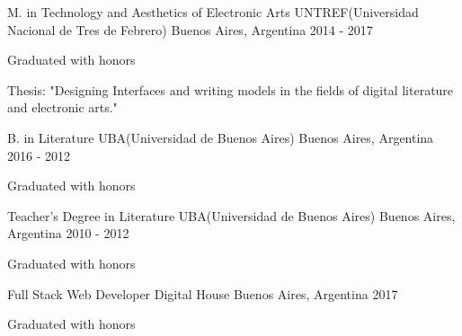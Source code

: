 

\begin{cventries}

  \cventry
    {M. in Technology and Aesthetics of Electronic Arts} %
    {UNTREF(Universidad Nacional de Tres de Febrero)} %
    {Buenos Aires, Argentina} %
    {2014 - 2017} %
    {
      \begin{cvitems} %
        \item {Graduated with honors}
        \item {Thesis: "Designing Interfaces and writing models in the fields of digital literature and electronic arts."}
      \end{cvitems}
    }
  \cventry
    {B. in Literature} %
    {UBA(Universidad de Buenos Aires)} %
    {Buenos Aires, Argentina} %
    {2016 - 2012} %
    {
      \begin{cvitems} %
        \item {Graduated with honors}
      \end{cvitems}
    }
    \cventry
    {Teacher's Degree in Literature} %
    {UBA(Universidad de Buenos Aires)} %
    {Buenos Aires, Argentina} %
    {2010 - 2012} %
    {
      \begin{cvitems} %
        \item {Graduated with honors}
      \end{cvitems}
    }
     \cventry
    {Full Stack Web Developer} %
    {Digital House} %
    {Buenos Aires, Argentina} %
    {2017} %
    {
      \begin{cvitems} %
        \item {Graduated with honors}
      \end{cvitems}
    }
\end{cventries}
